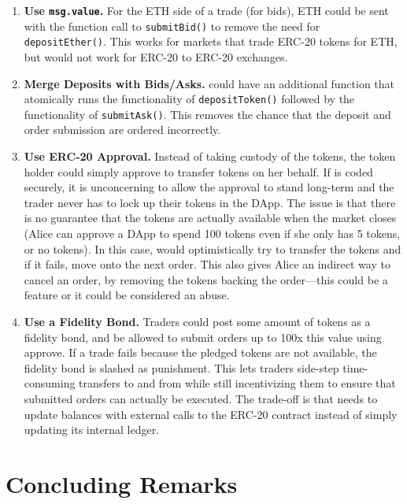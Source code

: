\begin{enumerate}

\item \textbf{Use \texttt{msg.value}.} For the ETH side of a trade (\ie for bids), ETH could be sent with the function call to \texttt{submitBid()} to remove the need for    \texttt{depositEther()}. This works for markets that trade ERC-20 tokens for ETH, but would not work for ERC-20 to ERC-20 exchanges. 

\item \textbf{Merge Deposits with Bids/Asks.} \cm could have an additional function that atomically runs the functionality of \texttt{depositToken()} followed by the functionality of \texttt{submitAsk()}. This removes the chance that the deposit and order submission are ordered incorrectly.

\item \textbf{Use ERC-20 Approval.} Instead of \cm taking custody of the tokens, the token holder could simply approve \cm to transfer tokens on her behalf. If \cm is coded securely, it is unconcerning to allow the approval to stand long-term and the trader never has to lock up their tokens in the DApp. The issue is that there is no guarantee that the tokens are actually available when the market closes (\ie Alice can approve a DApp to spend 100 tokens even if she only has 5 tokens, or no tokens). In this case, \cm would optimistically try to transfer the tokens and if it fails, move onto the next order. This also gives Alice an indirect way to cancel an order, by removing the tokens backing the order---this could be a feature or it could be considered an abuse.

\item \textbf{Use a Fidelity Bond.} Traders could post some amount of tokens as a fidelity bond, and be allowed to submit orders up to 100x this value using approve. If a trade fails because the pledged tokens are not available, the fidelity bond is slashed as punishment. This lets traders side-step time-consuming transfers to and from \cm while still incentivizing them to ensure that submitted orders can actually be executed. The trade-off  is that \cm needs to update balances with external calls to the ERC-20 contract instead of simply updating its internal ledger. 

\end{enumerate}


\section{Concluding Remarks} 

